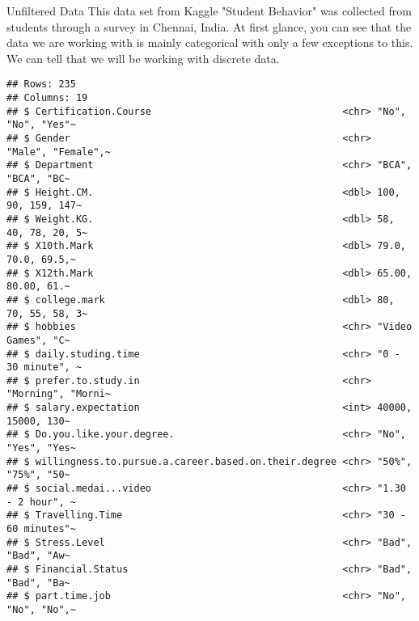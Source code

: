 \documentclass[
  ignorenonframetext,
]{beamer}
\begin{document}
\begin{frame}[fragile]{Unfiltered Data}
\protect\hypertarget{unfiltered-data}{}
This data set from Kaggle "Student Behavior" was collected from students
through a survey in Chennai, India. At first glance, you can see that
the data we are working with is mainly categorical with only a few
exceptions to this. We can tell that we will be working with discrete
data.~

\begin{verbatim}
## Rows: 235
## Columns: 19
## $ Certification.Course                                 <chr> "No", "No", "Yes"~
## $ Gender                                               <chr> "Male", "Female",~
## $ Department                                           <chr> "BCA", "BCA", "BC~
## $ Height.CM.                                           <dbl> 100, 90, 159, 147~
## $ Weight.KG.                                           <dbl> 58, 40, 78, 20, 5~
## $ X10th.Mark                                           <dbl> 79.0, 70.0, 69.5,~
## $ X12th.Mark                                           <dbl> 65.00, 80.00, 61.~
## $ college.mark                                         <dbl> 80, 70, 55, 58, 3~
## $ hobbies                                              <chr> "Video Games", "C~
## $ daily.studing.time                                   <chr> "0 - 30 minute", ~
## $ prefer.to.study.in                                   <chr> "Morning", "Morni~
## $ salary.expectation                                   <int> 40000, 15000, 130~
## $ Do.you.like.your.degree.                             <chr> "No", "Yes", "Yes~
## $ willingness.to.pursue.a.career.based.on.their.degree <chr> "50%", "75%", "50~
## $ social.medai...video                                 <chr> "1.30 - 2 hour", ~
## $ Travelling.Time                                      <chr> "30 - 60 minutes"~
## $ Stress.Level                                         <chr> "Bad", "Bad", "Aw~
## $ Financial.Status                                     <chr> "Bad", "Bad", "Ba~
## $ part.time.job                                        <chr> "No", "No", "No",~
\end{verbatim}
\end{frame}
\end{document}

